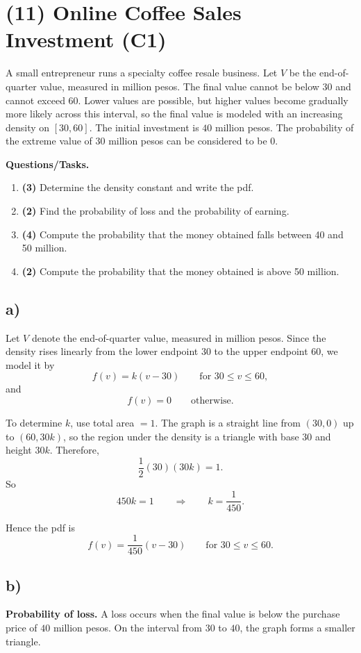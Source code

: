 \section{(11) Online Coffee Sales Investment (C1)}

A small entrepreneur runs a specialty coffee resale business. Let $V$ be the end-of-quarter value, measured in million pesos. The final value cannot be below $30$ and cannot exceed $60$. Lower values are possible, but higher values become gradually more likely across this interval, so the final value is modeled with an increasing density on $[30,60]$. The initial investment is $40$ million pesos. The probability of the extreme value of 30 million pesos can be considered to be 0.

\textbf{Questions/Tasks.}
\begin{enumerate}[label=\textbf{\alph*)}]
	\item \textbf{(3)} Determine the density constant and write the pdf.
	\item \textbf{(2)} Find the probability of loss and the probability of earning.
	\item \textbf{(4)} Compute the probability that the money obtained falls between 40 and 50 million.
	\item \textbf{(2)} Compute the probability that the money obtained is above 50 million.

\end{enumerate}

\subsection*{a)}
Let $V$ denote the end-of-quarter value, measured in million pesos. Since the density rises linearly from the lower endpoint $30$ to the upper endpoint $60$, we model it by
\[
f(v)=k(v-30)\qquad \text{for }30\le v\le 60,
\]
and
\[
f(v)=0\qquad \text{otherwise.}
\]

To determine $k$, use total area $=1$. The graph is a straight line from $(30,0)$ up to $(60,30k)$, so the region under the density is a triangle with base $30$ and height $30k$. Therefore,
\[
\frac12(30)(30k)=1.
\]
So
\[
450k=1
\qquad \Rightarrow \qquad
k=\frac{1}{450}.
\]

Hence the pdf is
\[
f(v)=\frac{1}{450}(v-30)\qquad \text{for }30\le v\le 60.
\]

\subsection*{b)}
\textbf{Probability of loss.} A loss occurs when the final value is below the purchase price of $40$ million pesos. On the interval from $30$ to $40$, the graph forms a smaller triangle.


